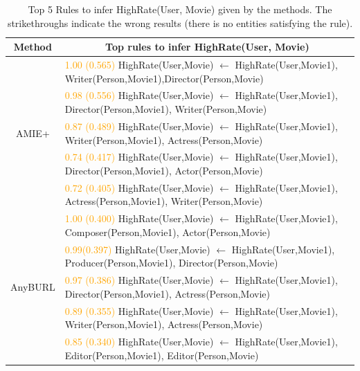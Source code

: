 \begin{table}[t]
\centering
\caption{Top 5 Rules to infer HighRate(User, Movie) given by the methods. The strikethroughs indicate the wrong results (there is no entities satisfying the rule).
}
\label{tab:rules_recom_result}
\vspace{-1pt}
{\tiny
\begin{tabular}{c|l}
\hline
\textbf{Method} & \multicolumn{1}{c}{\textbf{ Top rules to infer HighRate(User, Movie)}} \\
\hline

\multirow{5}{*}{AMIE+} &
\textcolor{orange}{1.00 (0.565)} HighRate(User,Movie) $\gets$ HighRate(User,Movie1), Writer(Person,Movie1),Director(Person,Movie)\\
& \textcolor{orange}{0.98 (0.556)} HighRate(User,Movie) $\gets$ HighRate(User,Movie1), Director(Person,Movie1), Writer(Person,Movie)\\
& \textcolor{orange}{0.87 (0.489)} HighRate(User,Movie) $\gets$ HighRate(User,Movie1), Writer(Person,Movie1), Actress(Person,Movie)\\
& \textcolor{orange}{0.74 (0.417)} HighRate(User,Movie) $\gets$ HighRate(User,Movie1), Director(Person,Movie1), Actor(Person,Movie)\\
& \textcolor{orange}{0.72 (0.405)} HighRate(User,Movie) $\gets$ HighRate(User,Movie1), Actress(Person,Movie1), Writer(Person,Movie)\\
\hline

\multirow{5}{*}{AnyBURL} &
\textcolor{orange}{1.00 (0.400)} HighRate(User,Movie) $\gets$ HighRate(User,Movie1), Composer(Person,Movie1), Actor(Person,Movie)\\
& \textcolor{orange}{0.99(0.397)} HighRate(User,Movie) $\gets$ HighRate(User,Movie1), Producer(Person,Movie1), Director(Person,Movie)\\
& \textcolor{orange}{0.97 (0.386)} HighRate(User,Movie) $\gets$ HighRate(User,Movie1), Director(Person,Movie1), Actress(Person,Movie)\\
& \textcolor{orange}{0.89 (0.355)} HighRate(User,Movie) $\gets$ HighRate(User,Movie1), Writer(Person,Movie1), Actress(Person,Movie)\\
& \textcolor{orange}{0.85 (0.340)} HighRate(User,Movie) $\gets$ HighRate(User,Movie1), Editor(Person,Movie1), Editor(Person,Movie)\\
\hline




\end{tabular}}
\end{table}
